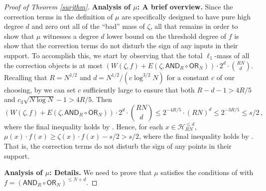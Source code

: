 \documentclass{toc}
\newcommand{\OR}{\mathsf{ OR}}
\newcommand{\Hcal}{\mathcal{H}}
\newcommand{\AND}{\mathsf{AND}}
\begin{document}
\begin{proof}[Proof of Theorem \ref{surjthm}]
	
	
	\medskip
	\noindent \textbf{Analysis of $\mu$: A brief overview.}
	Since the correction terms in the definition of $\mu$ are specifically designed to have pure high degree $d$
	and zero out all of the ``bad'' mass of $\zeta$, all that remains in order to show that
	$\mu$ witnesses a degree $d$ lower bound on the threshold degree of $f$ is show that the correction terms do not
	disturb the sign of any inputs in their support. To accomplish this,
	we start by observing that the total $\ell_1$-mass of all the correction objects is at most $(W(\zeta, f)+E(\zeta, \AND_R \circ \OR_N)) \cdot 2^{d} \cdot {RN \choose d}$. 
	Recalling that $R=N^{1/2}$ and $d = N^{1/2}/(c \log^{3/2} N)$ for a constant $c$ of our choosing, by   we can set $c$ sufficiently large to ensure that both 
	$R-d - 1 > 4R/5$ and $c_3 \sqrt{N \log N} -1 > 4R/5$.
	Then \begin{equation}
	\label{akeyeq} \left(W(\zeta, f)+E\left(\zeta, \AND_R \circ \OR_N\right)\right) \cdot 2^{d} \cdot {RN \choose d} \leq 2^{-4R/5} \cdot (RN)^d \leq  2^{-3R/5} \leq s/2\,,\end{equation} 
	where the final inequality holds by .
	Hence, for each $x \in \Hcal_{RN}^{\leq d}$,
	$\mu(x) \cdot f(x) \geq \zeta(x) \cdot f(x) - s/2 > s/2$, where the final inequality holds by . That is, the correction terms do not disturb the sign of any points in their support.
	
	\medskip
	\noindent \textbf{Analysis of $\mu$: Details.} 
	We need to prove that $\mu$ satisfies the conditions of  with $f=(\AND_R \circ \OR_N)^{\leq N + d}$. 
	

\end{proof}
\end{document}
